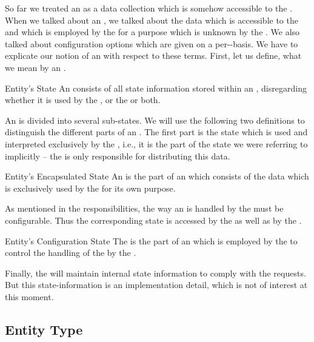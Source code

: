 \documentclass[a4paper, 12pt]{book}
\begin{document}
So far we treated an  as a data collection which is somehow
accessible to the . When we talked about an , we
talked about the data which is accessible to the  and which is
employed by the  for a purpose which is unknown by the
\SYNEIGHT. We also talked about configuration options which are given on
a per--basis.
%
We have to explicate our notion of an  with respect to these
terms.
%
First, let us define, what we mean by an .
\begin{definition*}{Entity's State}
  \label{def:entitys-state}
  An  consists of all state information stored within an
  , disregarding whether it is used by the \SYNEIGHT, or the
   or both.  
\end{definition*}
%
An  is divided into several sub-states. We will use the
following two definitions to distinguish the different parts of an
.
%
The first part is the state which is used and interpreted exclusively by the
, i.e., it is the part of the state we were referring to implicitly
-- the \SYNEIGHT is only responsible for distributing this data.
\begin{definition*}{Entity's Encapsulated State}
  \label{def:encapsulated-state}
  An  is the part of an 
  which consists of the data which is exclusively used by the  for its
  own purpose. 
\end{definition*}
As mentioned in the responsibilities, the way an  is
handled by the \SYNEIGHT must be configurable. Thus the corresponding
state is accessed by the  as well as by the \SYNEIGHT.
\begin{definition*}{Entity's Configuration State}
  The  is the part of an 
  which is employed by the  to control the handling of the
   by the \SYNEIGHT.
\end{definition*}
Finally, the \SYNEIGHT will maintain internal state information to
comply with the  requests. But this state-information is an
implementation detail, which is not of interest at this moment.

\subsection{Entity Type}
\end{document}
